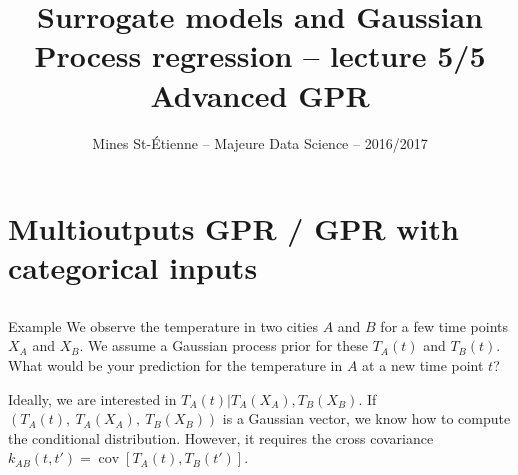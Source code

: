 \documentclass{beamer}
\title[Majeure Data Science -- Surrogate models and GPR]{\texorpdfstring{ \small Surrogate models and Gaussian Process regression -- lecture 5/5 \\ \vspace{3mm} \LARGE Advanced GPR}{}}
\author[Mines St-\'Etienne ]{Mines St-\'Etienne -- Majeure Data Science -- 2016/2017}
\institute{\texorpdfstring{Nicolas Durrande (durrande@emse.fr)}{}}
\date{\null}
\DeclareMathOperator*{\Cov}{cov}
\begin{document}

\begin{frame}
  \titlepage
\end{frame}

\section[Multioutputs GPR]{Multioutputs GPR / GPR with categorical inputs}
\subsection{}

\begin{frame}{}
\begin{exampleblock}{Example}
	We observe the temperature in two cities $A$ and $B$ for a few time points $X_A$ and $X_B$. We assume a Gaussian process prior for these $T_A(t)$ and $T_B(t)$. What would be your prediction for the temperature in $A$ at a new time point $t$?
\end{exampleblock}
\pause
Ideally, we are interested in $T_A(t)|T_A(X_A), T_B(X_B)$. If $(T_A(t),\ T_A(X_A),\ T_B(X_B))$ is a Gaussian vector, we know how to compute the conditional distribution. However, it requires the cross covariance $k_{AB}(t,t') = \Cov[T_A(t),T_B(t')]$.
\end{frame}
\end{document}
